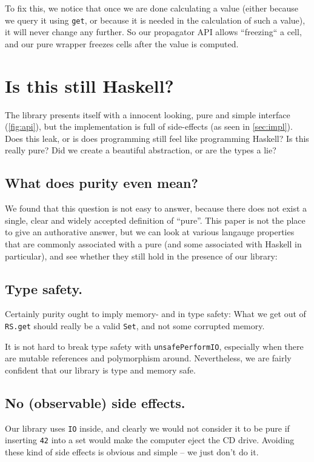 \documentclass[manuscript,screen,acmsmall]{acmart}
\begin{document}
To fix this, we notice that once we are done calculating a value (either because we query it using \verb|get|, or because it is needed in the calculation of such a value), it will never change any further. So our propagator API allows “freezing“ a cell, and our pure wrapper freezes cells after the value is computed.

\section{Is this still Haskell?}\label{sec:pure}

The library presents itself with a innocent looking, pure and simple interface (\cref{fig:api}), but the implementation is full of side-effects (as seen in \cref{sec:impl}).
Does this leak, or is does programming still feel like programming Haskell?
Is this really pure? Did we create a beautiful abstraction, or are the types a lie?

\subsection{What does purity even mean?}

We found that this question is not easy to answer, because there does not exist a single, clear and widely accepted definition of “pure”.
This paper is not the place to give an authorative answer, but we can look at various langauge properties that are commonly associated with a pure  (and some associated with Haskell in particular), and see whether they still hold in the presence of our library:

\subsection{Type safety.}

Certainly purity ought to imply memory- and in type safety: What we get out of \verb|RS.get| should really be a valid \verb|Set|, and not some corrupted memory.

It is not hard to break type safety with \verb|unsafePerformIO|, especially when there are mutable references and polymorphism around. Nevertheless, we are fairly confident that our library is type and memory safe.

\subsection{No (observable) side effects.}

Our library uses \verb|IO| inside, and clearly we would not consider it to be pure if inserting \verb|42| into a set would make the computer eject the CD drive. Avoiding these kind of side effects is obvious and simple -- we just don't do it.
\end{document}
